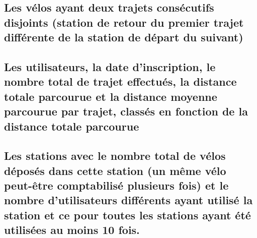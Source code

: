\documentclass[a4paper,10pt]{article}
\begin{document}
\subsection{Les vélos ayant deux trajets consécutifs disjoints (station de retour du premier trajet différente de la station de départ du suivant)}

\subsection{Les utilisateurs, la date d'inscription, le nombre total de trajet effectués, la distance totale parcourue et la distance moyenne parcourue par trajet, classés en fonction de la distance totale parcourue}

\subsection{Les stations avec le nombre total de vélos déposés dans cette station (un même vélo peut-être comptabilisé plusieurs fois) et le nombre d'utilisateurs différents ayant utilisé la station et ce pour toutes les stations ayant été utilisées au moins 10 fois.}
\end{document}
